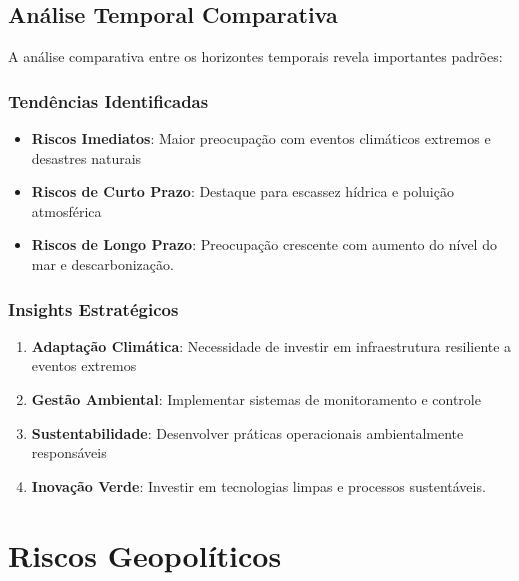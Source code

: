 \documentclass[
  portuguese,
  letterpaper,
  DIV=11,
  numbers=noendperiod]{scrreprt}
\providecommand{\tightlist}{%
  \setlength{\itemsep}{0pt}\setlength{\parskip}{0pt}}
\begin{document}
\section{Análise Temporal
Comparativa}\label{anuxe1lise-temporal-comparativa-1}

A análise comparativa entre os horizontes temporais revela importantes
padrões:

\subsection{Tendências
Identificadas}\label{tenduxeancias-identificadas-1}

\begin{itemize}
\tightlist
\item
  \textbf{Riscos Imediatos}: Maior preocupação com eventos climáticos
  extremos e desastres naturais
\item
  \textbf{Riscos de Curto Prazo}: Destaque para escassez hídrica e
  poluição atmosférica
\item
  \textbf{Riscos de Longo Prazo}: Preocupação crescente com aumento do
  nível do mar e descarbonização.
\end{itemize}

\subsection{Insights Estratégicos}\label{insights-estratuxe9gicos-1}

\begin{enumerate}
\def\labelenumi{\arabic{enumi}.}
\tightlist
\item
  \textbf{Adaptação Climática}: Necessidade de investir em
  infraestrutura resiliente a eventos extremos
\item
  \textbf{Gestão Ambiental}: Implementar sistemas de monitoramento e
  controle
\item
  \textbf{Sustentabilidade}: Desenvolver práticas operacionais
  ambientalmente responsáveis
\item
  \textbf{Inovação Verde}: Investir em tecnologias limpas e processos
  sustentáveis.
\end{enumerate}


\chapter{Riscos Geopolíticos}\label{riscos-geopoluxedticos-1}
\end{document}
